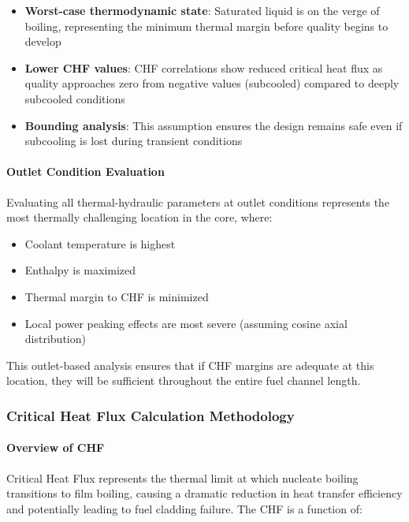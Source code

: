 \begin{itemize}
    \item \textbf{Worst-case thermodynamic state}: Saturated liquid is on the verge of boiling, representing the minimum thermal margin before quality begins to develop
    
    \item \textbf{Lower CHF values}: CHF correlations show reduced critical heat flux as quality approaches zero from negative values (subcooled) compared to deeply subcooled conditions
    
    \item \textbf{Bounding analysis}: This assumption ensures the design remains safe even if subcooling is lost during transient conditions
\end{itemize}

\paragraph{Outlet Condition Evaluation}

Evaluating all thermal-hydraulic parameters at outlet conditions represents the most thermally challenging location in the core, where:

\begin{itemize}
    \item Coolant temperature is highest
    \item Enthalpy is maximized
    \item Thermal margin to CHF is minimized
    \item Local power peaking effects are most severe (assuming cosine axial distribution)
\end{itemize}

This outlet-based analysis ensures that if CHF margins are adequate at this location, they will be sufficient throughout the entire fuel channel length.

\subsubsection{Critical Heat Flux Calculation Methodology}

\paragraph{Overview of CHF}

Critical Heat Flux represents the thermal limit at which nucleate boiling transitions to film boiling, causing a dramatic reduction in heat transfer efficiency and potentially leading to fuel cladding failure. The CHF is a function of:

